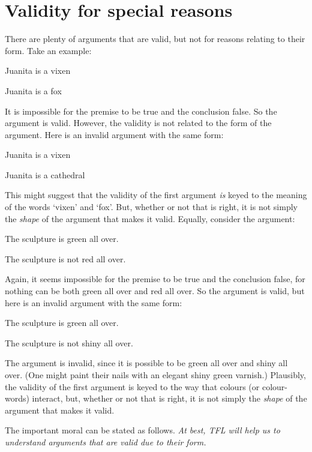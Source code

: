 \section{Validity for special reasons}
There are plenty of arguments that are valid, but not for reasons relating to their form. Take an example:
	\begin{earg}
		\item[] Juanita is a vixen
		\item[\therefore] Juanita is a fox
	\end{earg}
It is impossible for the premise to be true and the conclusion false. So the argument is valid. However, the validity is not related to the form of the argument. Here is an invalid argument with the same form:
	\begin{earg}
		\item[] Juanita is a vixen
		\item[\therefore] Juanita is a cathedral
	\end{earg}
This might suggest that the validity of the first argument \emph{is} keyed to the meaning of the words `vixen' and `fox'. But, whether or not that is right, it is not simply the \emph{shape} of the argument that makes it valid. Equally, consider the argument:
	\begin{earg}
		\item[] The sculpture is green all over.
		\item[\therefore] The sculpture is not red all over. 
	\end{earg}
Again, it seems impossible for the premise to be true and the conclusion false, for nothing can be both green all over and red all over. So the argument is valid, but here is an invalid argument with the same form:
	\begin{earg}
		\item[] The sculpture is green all over.
		\item[\therefore] The sculpture is not shiny all over.
	\end{earg}
The argument is invalid, since it is possible to be green all over and shiny all over. (One might paint their nails with an elegant shiny green varnish.) Plausibly, the validity of the first argument is keyed to the way that colours (or colour-words) interact, but, whether or not that is right, it is not simply the \emph{shape} of the argument that makes it valid. 

The important moral can be stated as follows. \emph{At best, TFL will help us to understand arguments that are valid due to their form.}

